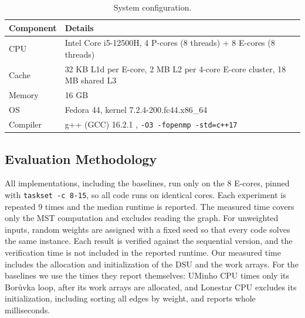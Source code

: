 \documentclass[11pt,a4paper]{article}
\begin{document}
\begin{table}[H]
  \centering
  \small
  \caption{System configuration.}
  \label{tab:system}
  \begin{tabular}{ll}
    \toprule
    \textbf{Component} & \textbf{Details} \\
    \midrule
    CPU       & Intel Core i5-12500H, 4 P-cores (8 threads) + 8 E-cores (8 threads) \\
    Cache     & 32 KB L1d per E-core, 2 MB L2 per 4-core E-core cluster, 18 MB shared L3 \\
    Memory    & 16 GB \\
    OS        & Fedora 44, kernel 7.2.4-200.fc44.x86\_64 \\
    Compiler  & g++ (GCC) 16.2.1 , \texttt{-O3 -fopenmp -std=c++17} \\
    \bottomrule
  \end{tabular}
\end{table}

\subsection*{Evaluation Methodology}
All implementations, including the baselines, run only on the 8 E-cores, pinned with \texttt{taskset -c 8-15}, so all code runs on identical cores. Each experiment is repeated 9 times and the median runtime is reported. The measured time covers only the MST computation and excludes reading the graph. For unweighted inputs, random weights are assigned with a fixed seed so that every code solves the same instance. Each result is verified against the sequential version, and the verification time is not included in the reported runtime. Our measured time includes the allocation and initialization of the DSU and the work arrays. For the baselines we use the times they report themselves: UMinho CPU times only its Bor\r{u}vka loop, after its work arrays are allocated, and Lonestar CPU excludes its initialization, including sorting all edges by weight, and reports whole milliseconds.
\end{document}

